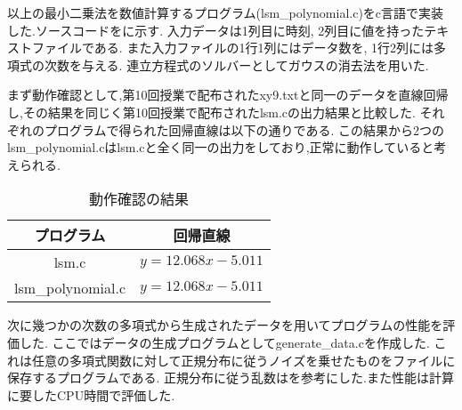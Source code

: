 以上の最小二乗法を数値計算するプログラム(lsm\_polynomial.c)をc言語で実装した.ソースコードをに示す.
入力データは1列目に時刻,
2列目に値を持ったテキストファイルである.
また入力ファイルの1行1列にはデータ数を,
1行2列には多項式の次数を与える.
連立方程式のソルバーとしてガウスの消去法を用いた.

まず動作確認として,第10回授業で配布されたxy9.txtと同一のデータを直線回帰し,その結果を同じく第10回授業で配布されたlsm.cの出力結果と比較した.
それぞれのプログラムで得られた回帰直線は以下の通りである.
この結果から2つのlsm\_polynomial.cはlsm.cと全く同一の出力をしており,正常に動作していると考えられる.
\begin{table}[h]
\caption{動作確認の結果}
\label{tab:dousakakunin}
\centering
\begin{tabular}{cc}
\hline
プログラム&回帰直線\\
\hline \hline
lsm.c&$y=12.068x-5.011$\\
lsm\_polynomial.c&$y=12.068x-5.011$\\
\hline
\end{tabular}
\end{table}

次に幾つかの次数の多項式から生成されたデータを用いてプログラムの性能を評価した.
ここではデータの生成プログラムとしてgenerate\_data.cを作成した.
これは任意の多項式関数に対して正規分布に従うノイズを乗せたものをファイルに保存するプログラムである.
正規分布に従う乱数は\cite{ransu}を参考にした.また性能は計算に要したCPU時間で評価した.